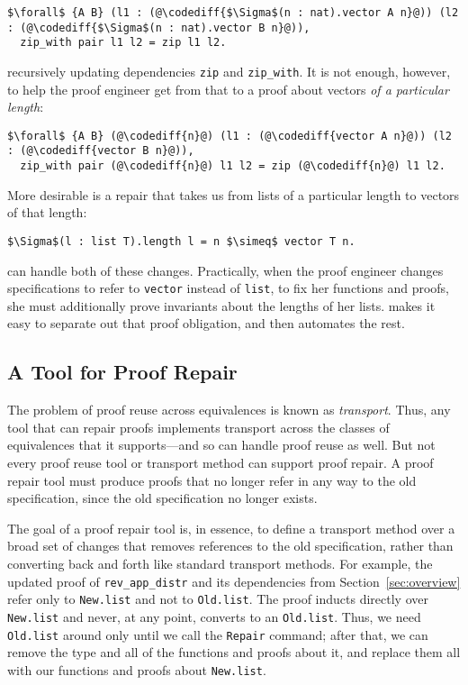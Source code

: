 \begin{lstlisting}
$\forall$ {A B} (l1 : (@\codediff{$\Sigma$(n : nat).vector A n}@)) (l2 : (@\codediff{$\Sigma$(n : nat).vector B n}@)),
  zip_with pair l1 l2 = zip l1 l2.
\end{lstlisting}
recursively updating dependencies \lstinline{zip} and \lstinline{zip_with}.
It is not enough, however, to help the proof engineer get from that to a proof about vectors \textit{of a particular length}:

\begin{lstlisting}
$\forall$ {A B} (@\codediff{n}@) (l1 : (@\codediff{vector A n}@)) (l2 : (@\codediff{vector B n}@)),
  zip_with pair (@\codediff{n}@) l1 l2 = zip (@\codediff{n}@) l1 l2.
\end{lstlisting}

More desirable is a repair that takes us from lists of a particular length to vectors of that length:

\begin{lstlisting}
$\Sigma$(l : list T).length l = n $\simeq$ vector T n.
\end{lstlisting}
\toolname can handle both of these changes.
Practically, when the proof engineer changes specifications to refer to \lstinline{vector} instead of \lstinline{list},
to fix her functions and proofs, she must additionally prove invariants about the lengths of her lists.
\toolname makes it easy to separate out that proof obligation, and then automates the rest.

\subsection{A Tool for Proof Repair}
\label{sec:time}

The problem of proof reuse across equivalences is known as \textit{transport}. %
Thus, any tool that can repair proofs implements transport across the classes
of equivalences that it supports---and so can handle proof reuse as well.
But not every proof reuse tool or transport method can support proof repair.
A proof repair tool must produce proofs
that no longer refer in any way to the old specification, since the old specification no longer exists.

The goal of a proof repair tool is, in essence, to
define a transport method over a broad set of changes that
removes references to the old specification, rather than converting back and forth
like standard transport methods.
For example, the updated proof of \lstinline{rev_app_distr} and its dependencies
from Section~\ref{sec:overview} refer only to \lstinline{New.list} and not to \lstinline{Old.list}.
The proof inducts directly over \lstinline{New.list} and never, at any point, converts to an \lstinline{Old.list}.
Thus, we need \lstinline{Old.list} around only until we call the \lstinline{Repair} command;
after that, we can remove the type and all of the functions and proofs about it, and replace them all with
our functions and proofs about \lstinline{New.list}.

